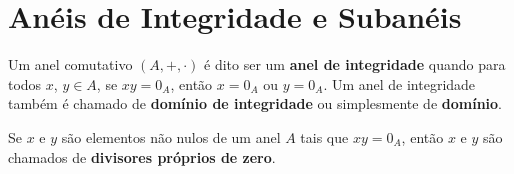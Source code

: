 \section{Anéis de Integridade e Subanéis} %
\label{sec:aneis_de_integridade_e_subaneis}

\begin{definicao}
    Um anel comutativo $(A, + , \cdot)$ é dito ser um \textbf{anel de integridade} quando para todos $x$, $y \in A$, se $xy = 0_A$, então $x = 0_A$ ou $y = 0_A$. Um anel
    de integridade também é chamado de \textbf{domínio de integridade} ou simplesmente de \textbf{domínio}.
\end{definicao}

\begin{observacao}
    Se $x$ e $y$ são elementos não nulos de um anel $A$ tais que $xy = 0_A$, então $x$ e $y$ são chamados de \textbf{divisores pr{\'o}prios de zero}.
\end{observacao}


